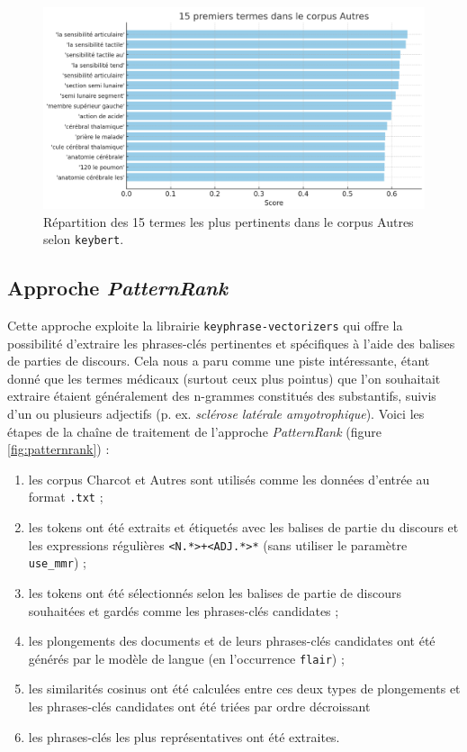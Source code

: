 \begin{figure}[!h]
    \centering
    \includegraphics[width=1\textwidth]{img/keybert_autres.png}
    \caption{Répartition des 15 termes les plus pertinents dans le corpus \og{}Autres\fg{} selon \texttt{keybert}.}
    \label{fig:keybert_autres}
\end{figure}


\subsection{Approche \textit{PatternRank}}
\label{patternrank}
Cette approche exploite la librairie \texttt{keyphrase-vectorizers} qui offre la possibilité d'extraire les phrases-clés pertinentes et spécifiques à l'aide des balises de parties de discours. Cela nous a paru comme une piste intéressante, étant donné que les termes médicaux (surtout ceux plus pointus) que l'on souhaitait extraire étaient généralement des n-grammes constitués des substantifs, suivis d'un ou plusieurs adjectifs (p. ex. \textit{sclérose latérale amyotrophique}). Voici les étapes de la chaîne de traitement de l'approche \textit{PatternRank} (figure \ref{fig:patternrank}) :
\begin{enumerate}
\item les corpus \og Charcot \fg{} et \og Autres \fg{} sont utilisés comme les données d'entrée au format \texttt{.txt} ;
\item les tokens ont été extraits et étiquetés avec les balises de partie du discours et les expressions régulières \texttt{<N.*>+<ADJ.*>*} (sans utiliser le paramètre \texttt{use\_mmr}) ;
\item les tokens ont été sélectionnés selon les balises de partie de discours souhaitées et gardés comme les phrases-clés candidates ;
\item les plongements des documents et de leurs phrases-clés candidates ont été générés par le modèle de langue (en l'occurrence \texttt{flair}) ;
\item les similarités cosinus ont été calculées entre ces deux types de plongements et les phrases-clés candidates ont été triées par ordre décroissant
\item les phrases-clés les plus représentatives ont été extraites.
\end{enumerate}


